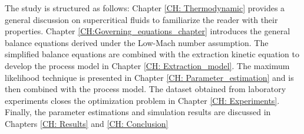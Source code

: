 \documentclass[../Article_Model_Parameters.tex]{subfiles}
\begin{document}
	The study is structured as follows: Chapter \ref{CH: Thermodynamic} provides a general discussion on supercritical fluids to familiarize the reader with their properties. Chapter \ref{CH:Governing_equations_chapter} introduces the general balance equations derived under the Low-Mach number assumption. The simplified balance equations are combined with the extraction kinetic equation to develop the process model in Chapter \ref{CH: Extraction_model}. The maximum likelihood technique is presented in Chapter \ref{CH: Parameter_estimation} and is then combined with the process model. The dataset obtained from laboratory experiments closes the optimization problem in Chapter \ref{CH: Experiments}. Finally, the parameter estimations and simulation results are discussed in Chapters \ref{CH: Results} and \ref{CH: Conclusion}
		
\end{document}
